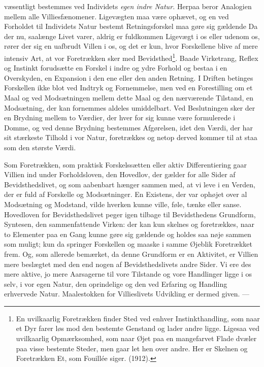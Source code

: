 \documentclass[12pt,a4paper,openany]{book}
\newcommand{\opage}[1]{\marginnote{\footnotesize\textit{[#1]}}}
\begin{document}
væsentligt bestemmes ved Individets \textit{egen indre Natur.}
\setcounter{footnote}{0}%
\opage{45}Herpaa beror Analogien mellem alle Villiesfænomener. Ligevægten
maa være ophævet, og en ved Forholdet til Individets
Natur bestemt Retningsforskel maa gøre sig gældende Da der
nu, saalænge Livet varer, aldrig er fuldkommen Ligevægt i os
eller udenom os, rører der sig en uafbrudt Villen i os, og det
er kun, hvor Forskellene blive af mere intensiv Art, at vor
Foretrækken sker med Bevidsthed\footnote[1]{En uvilkaarlig Foretrækken finder Sted ved enhver Instinkthandling, som naar et Dyr farer løs mod den bestemte Genstand og lader andre ligge. Ligesaa ved uvilkaarlig Opmærksomhed, som naar Øjet paa en mangefarvet Flade dvæler paa visse bestemte Steder, men gaar let hen over andre. Her er Skelnen og Foretrækken Et, som Fouillée siger. (1912).}. Baade Virketrang, Reflex
og Instinkt forudsætte en Forskel i indre og ydre Forhold og
bestaa i en Overskyden, en Expansion i den ene eller den
anden Retning. I Driften betinges Forskellen ikke blot ved
Indtryk og Fornemmelse, men ved en Forestilling om et Maal
og ved Modsætningen mellem dette Maal og den nærværende
Tilstand, en Modsætning, der kan fornemmes aldeles umiddelbart.
Ved Beslutningen sker der en Brydning mellem to Værdier,
der hver for sig kunne være formulerede i Domme, og
ved denne Brydning bestemmes Afgørelsen, idet den Værdi,
der har sit stærkeste Tilhold i vor Natur, foretrækkes og netop
derved kommer til at staa som den største Værdi.

Som Foretrækken, som praktisk Forskelssætten eller aktiv
Differentiering gaar Villien ind under Forholdsloven, den Hovedlov,
der gælder for alle Sider af Bevidsthedslivet, og som aabenbart
hænger sammen med, at vi leve i en Verden, der er fuld
af Forskelle og Modsætninger. En Existens, der var ophøjet
over al Modsætning og Modstand, vilde hverken kunne ville,
føle, tænke eller sanse. Hovedloven for Bevidsthedslivet peger
igen tilbage til Bevidsthedens Grundform, Syntesen, den sammenfattende
Virken: der kan kun skelnes og foretrækkes, naar
to Elementer paa en Gang kunne gøre sig gældende og holdes
saa nøje sammen som muligt; kun da springer Forskellen og
maaske i samme Øjeblik Foretrækket frem. Og, som allerede
\setcounter{footnote}{0}%
\opage{46}bemærket, da denne Grundform er en Aktivitet, er Villien mere
beslægtet med den end nogen af Bevidsthedslivets andre Sider.
Vi ere des mere aktive, jo mere Aarsagerne til vore Tilstande
og vore Handlinger ligge i os selv, i vor egen Natur, den
oprindelige og den ved Erfaring og Handling erhvervede Natur.
Maalestokken for Villieslivets Udvikling er dermed given. ---
\end{document}
